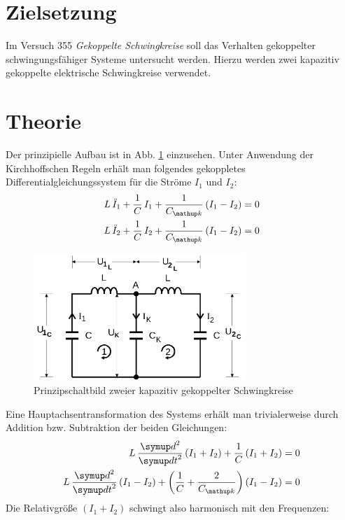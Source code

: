 \setcounter{page}{1}
\section*{Zielsetzung}
Im Versuch 355 \emph{Gekoppelte Schwingkreise} soll das Verhalten gekoppelter schwingungsfähiger Systeme untersucht werden. Hierzu
werden zwei kapazitiv gekoppelte elektrische Schwingkreise verwendet.
\section{Theorie}
Der prinzipielle Aufbau ist in Abb. \ref{fig: prinz_schwingkreis} einzusehen. Unter Anwendung der Kirchhoffschen Regeln erhält man folgendes gekoppletes
Differentialgleichungssystem für die Ströme $I_1$ und $I_2$:
\begin{align}
\begin{aligned}
L \, \ddot{I}_1 + \frac{1}{C} \, I_1 + \frac{1}{C\ua{k}} \left(I_1 - I_2 \right) &= 0 \\
L \, \ddot{I}_2 + \frac{1}{C} \, I_2 + \frac{1}{C\ua{k}} \left(I_1 - I_2 \right) &= 0 \\
\end{aligned}
\end{align}

\begin{figure}
  \centering
  \includegraphics[width = 8cm]{pics/prinzip_schwingkreis.png}
  \caption{Prinzipschaltbild zweier kapazitiv gekoppelter Schwingkreise \cite{anleitung355}}
  \label{fig: prinz_schwingkreis}
\end{figure}

Eine Hauptachsentransformation des Systems erhält man trivialerweise durch Addition bzw. %
Subtraktion der beiden Gleichungen:
\begin{align}
\begin{aligned}
  L\,\frac{\dif{}^2}{\dif{t}^2} \left( I_1 + I_2 \right) + \frac{1}{C} \left( I_1 + I_2 \right) &= 0 \\
  L\,\frac{\dif{}^2}{\dif{t}^2} \left( I_1 - I_2 \right) + \left(\frac{1}{C} + \frac{2}{C\ua{k}}\right) \left( I_1 - I_2 \right) &= 0 \\
  \label{eq: gekoppeltes_lgs}
\end{aligned}
\end{align}
Die Relativgröße $\left( I_1 + I_2 \right)$ schwingt also harmonisch mit den Frequenzen:


